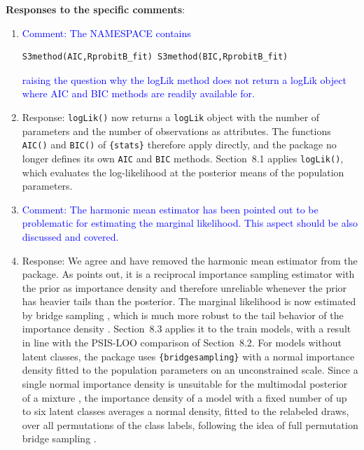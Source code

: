 \documentclass[12pt,a4paper]{article}
\begin{document}
\noindent \textbf{Responses to the specific comments}:

\begin{enumerate}
    \item \textcolor{blue}{Comment: The NAMESPACE contains}
\begin{verbatim}
S3method(AIC,RprobitB_fit) S3method(BIC,RprobitB_fit)
\end{verbatim}
    \textcolor{blue}{raising the question why the logLik method does not
    return a logLik object where AIC and BIC methods are readily available
    for.}
    \item[] Response: \texttt{logLik()} now returns a \texttt{logLik} object
    with the number of parameters and the number of observations as attributes.
    The functions \texttt{AIC()} and \texttt{BIC()} of \texttt{\{stats\}}
    therefore apply directly, and the package no longer defines its own
    \texttt{AIC} and \texttt{BIC} methods. Section~8.1 applies
    \texttt{logLik()}, which evaluates the log-likelihood at the posterior means
    of the population parameters.
    \item \textcolor{blue}{Comment: The harmonic mean estimator has been
    pointed out to be problematic for estimating the marginal likelihood. This
    aspect should be also discussed and covered.}
    \item[] Response: We agree and have removed the harmonic mean estimator from
    the package. As \textcite{FruehwirthSchnatter2004} points out, it is a
    reciprocal importance sampling estimator with the prior as importance
    density and therefore unreliable whenever the prior has heavier tails than
    the posterior. The marginal likelihood is now estimated by bridge sampling
    \parencite{Meng1996}, which is much more robust to the tail behavior of the
    importance density \parencite{FruehwirthSchnatter2004}. Section~8.3 applies
    it to the train models, with a result in line with the PSIS-LOO comparison
    of Section~8.2. For models without latent classes, the package uses
    \texttt{\{bridgesampling\}} \parencite{Gronau2020} with a normal importance
    density fitted to the population parameters on an unconstrained scale. Since
    a single normal importance density is unsuitable for the multimodal
    posterior of a mixture \parencite{FruehwirthSchnatter2004}, the importance
    density of a model with a fixed number of up to six latent classes averages
    a normal density, fitted to the relabeled draws, over all permutations of
    the class labels, following the idea of full permutation bridge sampling
    \parencite{Celeux2019,FruehwirthSchnatter2019b}.
\end{enumerate}
\end{document}
